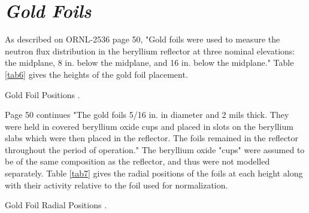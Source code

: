 \documentclass[ms,a4paper]{memoir}
\newcommand*{\msrarchive}{../../msr-archive}%
\begin{document}
\section{\emph{Gold Foils}}

As described on ORNL-2536 page 50, "Gold foils were used to measure the neutron flux distribution in the beryllium reflector at three nominal elevations: the midplane, 8 in. below the midplane, and 16 in. below the midplane." Table \ref{tab6} gives the heights of the gold foil placement.

\begin{table}[H]
  \centering
  \caption{Gold Foil Positions \parencite[Table 17]{ornl-2536}.}
  \label{tab6}
\end{table}

Page 50 continues "The gold foils 5/16 in. in diameter and 2 mils thick. They were held in covered beryllium oxide cups and placed in slots on the beryllium slabs which were then placed in the reflector. The foils remained in the reflector throughout the period of operation." The beryllium  oxide "cups" were assumed to be of the same composition as the reflector, and thus were not modelled separately. Table \ref{tab7} gives the radial positions of the foils at each height along with their activity relative to the foil used for normalization.

\begin{table}[H]
  \centering
  \caption{Gold Foil Radial Positions \parencite[Table 18]{ornl-2536}.}
  \label{tab7}
\end{table}

\printbibliography
\end{document}
